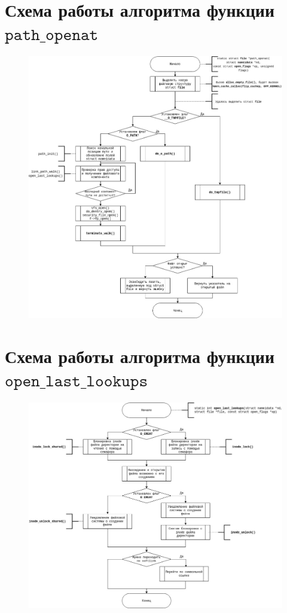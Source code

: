 \documentclass[12pt]{report}
\begin{document}
\section{Схема работы алгоритма функции $\texttt{path\_openat}$}

\begin{figure}[H]
	\centering
	\includegraphics[scale=0.54]{img/path_openat.jpg}
	\label{fig:path_openat}
\end{figure}

\section{Схема работы алгоритма функции $\texttt{open\_last\_lookups}$}

\begin{figure}[H]
	\centering
	\includegraphics[scale=0.52]{img/open_last_lookups.jpg}
	\label{fig:do_last}
\end{figure}
\end{document}
